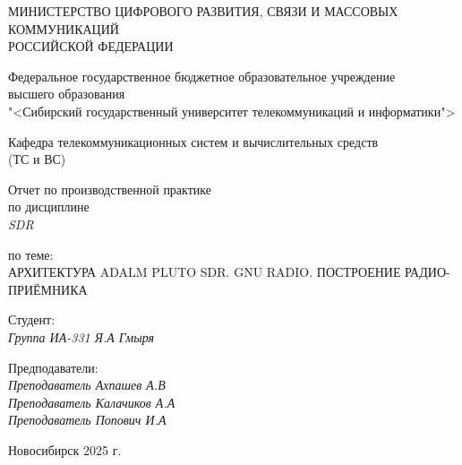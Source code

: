 \thispagestyle{empty}

\begin{center}
    МИНИСТЕРСТВО ЦИФРОВОГО РАЗВИТИЯ, СВЯЗИ И МАССОВЫХ КОММУНИКАЦИЙ \\ РОССИЙСКОЙ ФЕДЕРАЦИИ

    \vspace{20pt}

    Федеральное государственное бюджетное образовательное учреждение  \\  высшего образования \\
    "<Сибирский государственный университет телекоммуникаций и информатики"> \\

    \vspace{20pt}

    Кафедра телекоммуникационных систем и вычислительных средств \\  (ТС и ВС)
\end{center}

\vfill

\begin{center}
    Отчет по производственной практике \\  
    по дисциплине \\
    \textit{SDR}

    \vspace{20pt}
    по теме: \\
    \uppercase{Архитектура Adalm Pluto SDR. GNU Radio. Построение радио-приёмника}
\end{center}

\vfill

    \noindent Студент: \\
    \textit{Группа ИА-331 \hfill Я.А Гмыря}

    \vspace{20pt}

    \noindent Предподаватели: \\
    \textit{Преподаватель \hfill Ахпашев А.В} \\
    \textit{Преподаватель \hfill Калачиков А.А} \\
    \textit{Преподаватель \hfill Попович И.А}

\vfill

\begin{center}
    Новосибирск 2025 г.
\end{center}